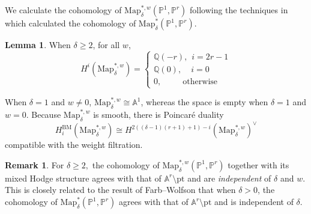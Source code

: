 \documentclass[12pt,reqno]{amsart}
\theoremstyle{definition}
\theoremstyle{definition}
\theoremstyle{definition}
\theoremstyle{definition}
\newtheorem{lemma}[theorem]{Lemma}
\newtheorem{remark}[theorem]{Remark}
\begin{document}
We calculate the cohomology of \(\mathrm{Map}_{{\delta}}^{*, w}(\mathbb{P}^1, \mathbb{P}^r)\) following the techniques in \cite{farbwolf} which calculated the cohomology of $\mathrm{Map}_{\delta}^* (\mathbb{P}^1, \mathbb{P}^r)$.

\begin{lemma}\label{lem:mapwdelta}
  When $\delta\geq 2$, for all $w$, $$
    H^i(\mathrm{Map}_{{\delta}}^{*, w})=\begin{cases*}
    \mathbb{Q}(-r), \hspace{5pt} i = 2r-1\\
    \mathbb{Q}(0), \hspace{13pt} i=0 \\
    0, \hspace{30pt} \text{otherwise}
  \end{cases*}$$

  When $\delta = 1$ and $w\neq 0$, $\mathrm{Map}_\delta^{*, w} \cong \mathbb{A}^1$, whereas the space is empty when $\delta = 1$ and $w=0.$ Because $\mathrm{Map}_{{\delta}}^{*, w}$ is smooth, there is Poincaré duality $$H_i^{\mathrm{BM}}(\mathrm{Map}_{{\delta}}^{*, w})\cong H^{2((\delta-1)(r+1)+1)-i}(\mathrm{Map}_{{\delta}}^{*, w})^\vee$$ compatible with the weight filtration.
\end{lemma}

\begin{remark}
  For $\delta\geq 2,$ the cohomology of $\mathrm{Map}_{\delta}^{*,w}(\mathbb{P}^1, \mathbb{P}^r)$ together with its mixed Hodge structure agrees with that of $\mathbb{A}^r\setminus \mathrm{pt}$ and are \emph{independent} of $\delta$ and $w.$ This is closely related to the result of Farb--Wolfson \cite[Theorem 1.2]{farbwolf} that when $\delta>0$, the cohomology of $\mathrm{Map}_{\delta}^{*}(\mathbb{P}^1, \mathbb{P}^r)$ agrees with that of $\mathbb{A}^r\setminus \mathrm{pt}$ and is independent of $\delta.$
\end{remark}
\end{document}
